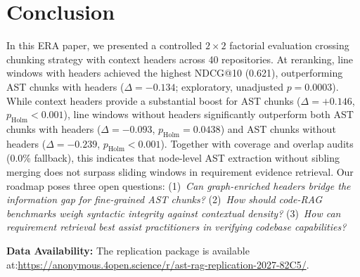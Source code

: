 \section{Conclusion}
\label{sec:conclusion}
In this ERA paper, we presented a controlled $2 \times 2$ factorial evaluation crossing chunking strategy with context headers across 40 repositories. 
At reranking, line windows with headers achieved the highest NDCG@10 (0.621), outperforming AST chunks with headers ($\Delta = -0.134$; exploratory, unadjusted $p = 0.0003$). While context headers provide a substantial boost for AST chunks ($\Delta = +0.146$, $p_{\mathrm{Holm}} < 0.001$), line windows without headers significantly outperform both AST chunks with headers ($\Delta = -0.093$, $p_{\mathrm{Holm}} = 0.0438$) and AST chunks without headers ($\Delta = -0.239$, $p_{\mathrm{Holm}} < 0.001$). 
Together with coverage and overlap audits (0.0\% fallback), this indicates that node-level AST extraction without sibling merging does not surpass sliding windows in requirement evidence retrieval. 
Our roadmap poses three open questions: (1)~\textit{Can graph-enriched headers bridge the information gap for fine-grained AST chunks?} (2)~\textit{How should code-RAG benchmarks weigh syntactic integrity against contextual density?} (3)~\textit{How can requirement retrieval best assist practitioners in verifying codebase capabilities?}

\smallskip\noindent\textbf{Data Availability:} The replication package is available at:\newline \url{https://anonymous.4open.science/r/ast-rag-replication-2027-82C5/}.

